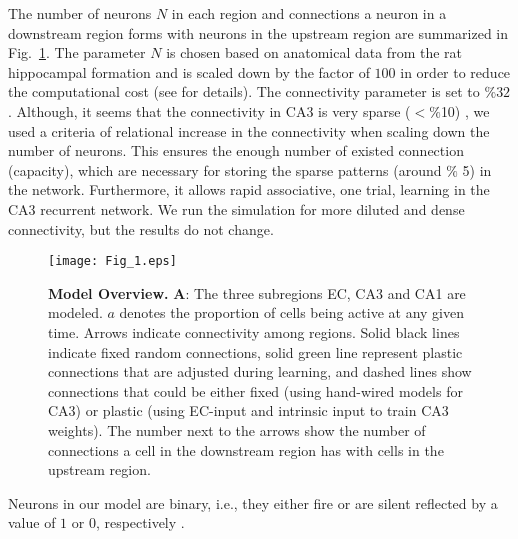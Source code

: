 \documentclass[utf8]{frontiersSCNS} %
\begin{document}
The number of neurons $N$ in each region and connections a neuron in a downstream region forms with neurons in the upstream region are summarized in Fig.~\ref{Fig_1}. The parameter $N$ is chosen based on anatomical data from the rat hippocampal formation \cite{amaral1990chapter, cutsuridis2010hippocampal} and is scaled down by the factor of $100$ in order to reduce the computational cost (see \cite{neher2015memory} for details). The connectivity parameter is set to $\% 32$. 
%
Although, it seems that the connectivity in CA3 is very sparse ($< \%$10) \cite{guzman2016synaptic}, we used a criteria of relational increase in the connectivity when scaling down the number of neurons. This ensures the enough number of existed connection (capacity), which are necessary for storing the sparse patterns (around $\%$ 5) in the network.  Furthermore, it allows rapid associative, one trial, learning in the CA3 recurrent network.
%
We run the simulation for more diluted and dense connectivity, but the results do not change. 

\begin{figure}[!htb]
\centering\texttt{[image: Fig\_1.eps]}
\caption{\textbf{Model Overview.} \textbf A: The three subregions EC, CA3 and CA1 are modeled. $a$ denotes the proportion of cells being active at any given time. Arrows indicate connectivity among regions. Solid black lines indicate fixed random connections, solid green line represent plastic connections that are adjusted during learning, and dashed lines show connections that could be either fixed (using hand-wired models for CA3) or plastic (using EC-input and intrinsic input to train CA3 weights). The number next to the arrows show the number of connections a cell in the downstream region has with cells in the upstream region.}
\label{Fig_1}
\end{figure}


Neurons in our model are binary, i.e., they either fire or are silent reflected by a value of $1$ or $0$, respectively \cite{fontanari1995model}.
\end{document}
